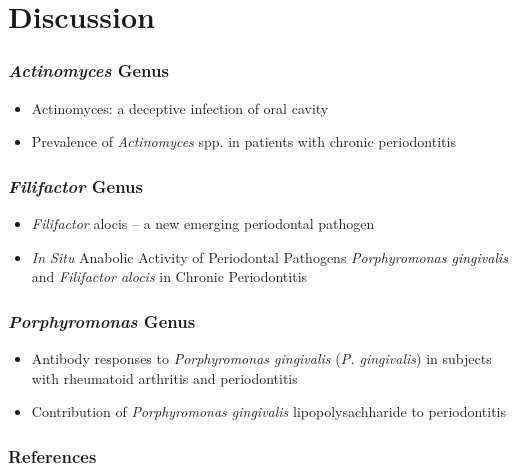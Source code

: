 \documentclass{beamer}
\begin{document}
    \section{Discussion}
    \begin{frame}
        \frametitle{\textit{Actinomyces} Genus}

        \begin{itemize}
            \item Actinomyces: a deceptive infection of oral cavity \cite{actinomyces1}
            \item Prevalence of \textit{Actinomyces} spp. in patients with chronic periodontitis \cite{actinomyces2}
        \end{itemize}
    \end{frame}

    \begin{frame}
        \frametitle{\textit{Filifactor} Genus}

        \begin{itemize}
            \item \textit{Filifactor} alocis – a new emerging periodontal pathogen \cite{filifactor1}
            \item \textit{In Situ} Anabolic Activity of Periodontal Pathogens \textit{Porphyromonas gingivalis} and \textit{Filifactor alocis} in Chronic Periodontitis \cite{filifactor2}
        \end{itemize}
    \end{frame}

    \begin{frame}
        \frametitle{\textit{Porphyromonas} Genus}

        \begin{itemize}
            \item Antibody responses to \textit{Porphyromonas gingivalis} (\textit{P. gingivalis}) in subjects with rheumatoid arthritis and periodontitis \cite{porphyromonas1}
            \item Contribution of \textit{Porphyromonas gingivalis} lipopolysachharide to periodontitis \cite{porphyromonas2}
        \end{itemize}
    \end{frame}

    \begin{frame}[allowframebreaks]
        \frametitle{References}
        
        
    \end{frame}
\end{document}
